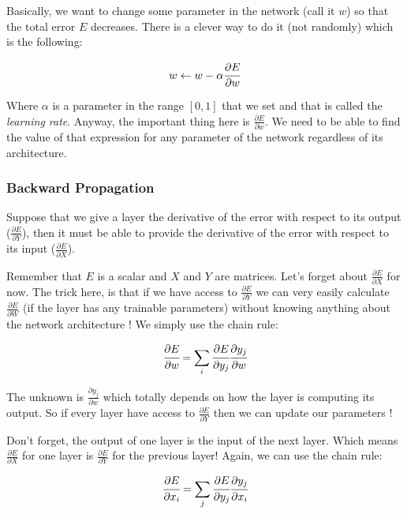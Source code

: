 Basically, we want to change some parameter in the network (call it $w$) so that the total error $E$ decreases. There is a clever way to do it (not randomly) which is the following:

\begin{equation}
w\leftarrow w - \alpha\cfrac{\partial E}{\partial w}
\end{equation}

Where $\alpha$ is a parameter in the range $[0,1]$ that we set and that is called the \emph{learning rate}. Anyway, the important thing here is $\frac{\partial E}{\partial w}$. We need to be able to find the value of that expression for any parameter of the network regardless of its architecture.

\subsubsection{Backward Propagation}

Suppose that we give a layer the derivative of the error with respect to its output ($\frac{\partial E}{\partial Y}$), then it must be able to provide the derivative of the error with respect to its input ($\frac{\partial E}{\partial X}$).

Remember that $E$ is a scalar and $X$ and $Y$ are matrices.
Let’s forget about $\frac{\partial E}{\partial X}$ for now. The trick here, is that if we have access to $\frac{\partial E}{\partial Y}$ we can very easily calculate $\frac{\partial E}{\partial W}$ (if the layer has any trainable parameters) without knowing anything about the network architecture ! We simply use the chain rule:

\begin{equation}
\cfrac{\partial E}{\partial w} = \sum_i \cfrac{\partial E}{\partial y_j}\cfrac{\partial y_j}{\partial w}
\end{equation}

The unknown is $\frac{\partial y_j}{\partial w}$ which totally depends on how the layer is computing its output. So if every layer have access to $\frac{\partial E}{\partial Y}$ then we can update our parameters !

Don’t forget, the output of one layer is the input of the next layer. Which means $\frac{\partial E}{\partial X}$ for one layer is $\frac{\partial E}{\partial Y}$ for the previous layer! Again, we can use the chain rule:

\begin{equation}
\cfrac{\partial E}{\partial x_i} = \sum_j \cfrac{\partial E}{\partial y_j}\cfrac{\partial y_j}{\partial x_i}
\end{equation}

